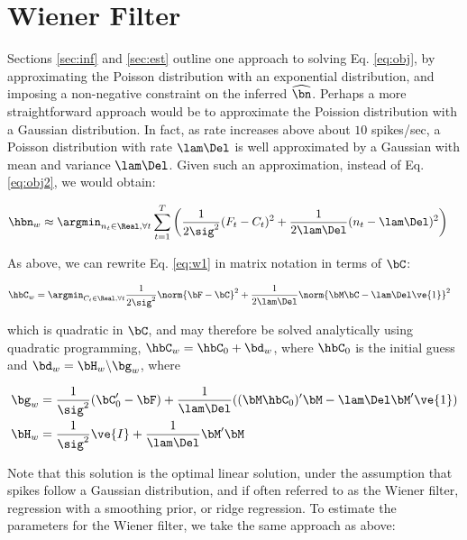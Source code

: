 \documentclass[12pt]{article}
\newcommand{\hnm}{\widehat{\bn}}
\begin{document}
\appendix

\section{Wiener Filter}

Sections \ref{sec:inf} and \ref{sec:est} outline one approach to solving Eq. \eqref{eq:obj}, by approximating the Poisson distribution with an exponential distribution, and imposing a non-negative constraint on the inferred $\hnm$.  Perhaps a more straightforward approach would be to approximate the Poission distribution with a Gaussian distribution.  In fact, as rate increases above about $10$ spikes/sec, a Poisson distribution with rate $\lam \Del$ is well approximated by a Gaussian with mean and variance $\lam \Del$.  Given such an approximation, instead of Eq. \eqref{eq:obj2}, we would obtain:

\begin{align} \label{eq:w1}
\hbn_{w} &\approx \argmin_{n_t \in \Real, \forall t} \sum_{t=1}^T \bigg(\frac{1}{2\sig^2} (F_t-C_t)^2 + \frac{1}{2 \lam \Del} (n_t - \lam \Del)^2\bigg)%
\end{align}

\noindent As above, we can rewrite Eq. \eqref{eq:w1} in matrix notation in terms of $\bC$:

\begin{align}   \label{eq:w2}
\hbC_{w}&= \argmin_{C_t \in \Real, \forall t} \frac{1}{2\sig^2} \norm{\bF - \bC}^2 + \frac{1}{2\lam\Del} \norm{\bM \bC - \lam\Del\ve{1}}^2 
\end{align}

\noindent which is quadratic in $\bC$, and may therefore be solved analytically using quadratic programming, $\hbC_w = \hbC_0 + \bd_w$, where $\hbC_0$ is the initial guess and $\bd_w=\bH_w \backslash \bg_w$, where

\begin{align}
\bg_w &= \frac{1}{\sig^2} (\bC_0' - \bF) + \frac{1}{\lam\Del} ( (\bM \hbC_0)' \bM - \lam\Del \bM' \ve{1}) \\
\bH_w &= \frac{1}{\sig^2} \ve{I} + \frac{1}{\lam\Del} \bM' \bM
\end{align}

Note that this solution is the optimal linear solution, under the assumption that spikes follow a Gaussian distribution, and if often referred to as the Wiener filter, regression with a smoothing prior, or ridge regression.  To estimate the parameters for the Wiener filter, we take the same approach as above:
\end{document}
